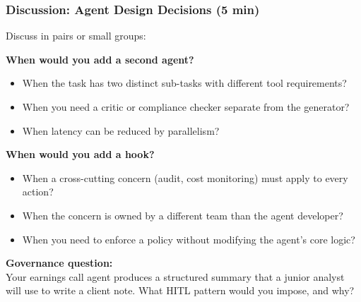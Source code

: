 \documentclass[9pt,t]{beamer}
\begin{document}
\begin{frame}
\frametitle{Discussion: Agent Design Decisions (5 min)}

Discuss in pairs or small groups:

\medskip
\textbf{When would you add a second agent?}
\begin{itemize}
  \item When the task has two distinct sub-tasks with different tool requirements?
  \item When you need a critic or compliance checker separate from the generator?
  \item When latency can be reduced by parallelism?
\end{itemize}

\medskip
\textbf{When would you add a hook?}
\begin{itemize}
  \item When a cross-cutting concern (audit, cost monitoring) must apply to every action?
  \item When the concern is owned by a different team than the agent developer?
  \item When you need to enforce a policy without modifying the agent's core logic?
\end{itemize}

\medskip
\textbf{Governance question:}\\
Your earnings call agent produces a structured summary that a junior analyst will
use to write a client note. What HITL pattern would you impose, and why?
\end{frame}
\end{document}
